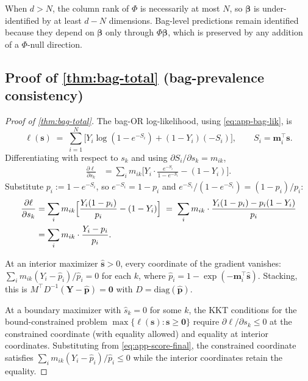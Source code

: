 When $d > N$, the column rank of $\Phi$ is necessarily at most $N$,
so $\bm\beta$ is under-identified by at least $d - N$ dimensions.
Bag-level predictions remain identified because they depend on
$\bm\beta$ only through $\Phi\bm\beta$, which is preserved by any
addition of a $\Phi$-null direction.

\subsection{Proof of \cref{thm:bag-total} (bag-prevalence consistency)}
\label{app:proof-bag-total}

\begin{proof}[Proof of \cref{thm:bag-total}]
The bag-OR log-likelihood, using \eqref{eq:app-bag-lik}, is
\begin{equation}
  \ell(\bm s)
  \;=\; \sum_{i=1}^N \Big[ Y_i \log(1 - e^{-S_i})
                          + (1 - Y_i)(-S_i) \Big],
  \qquad S_i = \bm m_i^\top \bm s.
  \label{eq:app-loglik}
\end{equation}
Differentiating with respect to $s_k$ and using
$\partial S_i / \partial s_k = m_{ik}$,
\begin{align}
  \frac{\partial \ell}{\partial s_k}
  &= \sum_i m_{ik} \Big[ Y_i \cdot \frac{e^{-S_i}}{1 - e^{-S_i}}
                          - (1 - Y_i) \Big].
  \label{eq:app-score-raw}
\end{align}
Substitute $p_i := 1 - e^{-S_i}$, so $e^{-S_i} = 1 - p_i$ and
$e^{-S_i}/(1 - e^{-S_i}) = (1 - p_i)/p_i$:
\begin{align}
  \frac{\partial \ell}{\partial s_k}
  &= \sum_i m_{ik} \Big[ \frac{Y_i(1 - p_i)}{p_i} - (1 - Y_i) \Big]
  \;=\; \sum_i m_{ik} \cdot \frac{Y_i(1 - p_i) - p_i(1 - Y_i)}{p_i} \notag \\
  &= \sum_i m_{ik} \cdot \frac{Y_i - p_i}{p_i}.
  \label{eq:app-score-final}
\end{align}

At an interior maximizer $\hat{\bm s} > 0$, every coordinate of the
gradient vanishes:
$\sum_i m_{ik}(Y_i - \hat p_i)/\hat p_i = 0$ for each $k$, where
$\hat p_i = 1 - \exp(-\bm m_i^\top \hat{\bm s})$. Stacking, this is
$M^\top D^{-1}(\bm Y - \hat{\bm p}) = \bm 0$ with $D =
\mathrm{diag}(\hat{\bm p})$.

At a boundary maximizer with $\hat s_k = 0$ for some $k$, the KKT
conditions for the bound-constrained problem
$\max\{\ell(\bm s) : \bm s \geq \bm 0\}$ require
$\partial \ell / \partial s_k \leq 0$ at the constrained coordinate
(with equality allowed) and equality at interior coordinates.
Substituting from \eqref{eq:app-score-final}, the constrained
coordinate satisfies $\sum_i m_{ik}(Y_i - \hat p_i)/\hat p_i \leq 0$
while the interior coordinates retain the equality. \qedhere
\end{proof}

